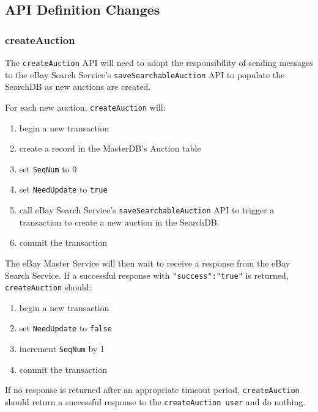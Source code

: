 \documentclass[12pt,a4paper]{article}
\begin{document}
\pagebreak
\subsection{API Definition Changes}

\subsubsection{createAuction}

The \texttt{createAuction} API will need to adopt the responsibility of sending messages to the eBay Search Service's
\texttt{saveSearchableAuction} API to populate the SearchDB as new auctions are created. 
\vspace{\baselineskip}

For each new auction, \texttt{createAuction} will:

\begin{enumerate}
    \item begin a new transaction
    \item create a record in the MasterDB's Auction table
    \item set \texttt{SeqNum} to 0
    \item set \texttt{NeedUpdate} to \texttt{true}
    \item call eBay Search Service's \texttt{saveSearchableAuction} API to trigger a transaction to create 
    a new auction in the SearchDB.
    \item commit the transaction
\end{enumerate}

The eBay Master Service will then wait to receive a response from the eBay Search Service. 
If a successful response with \texttt{"success":"true"} is returned, 
\texttt{createAuction} should:

\begin{enumerate}
    \item begin a new transaction
    \item set \texttt{NeedUpdate} to \texttt{false}
    \item increment \texttt{SeqNum} by 1
    \item commit the transaction
\end{enumerate}

If no response is returned after an appropriate timeout period, \texttt{createAuction} 
should return a successful response to the \texttt{createAuction user} and do nothing.


\end{document}
